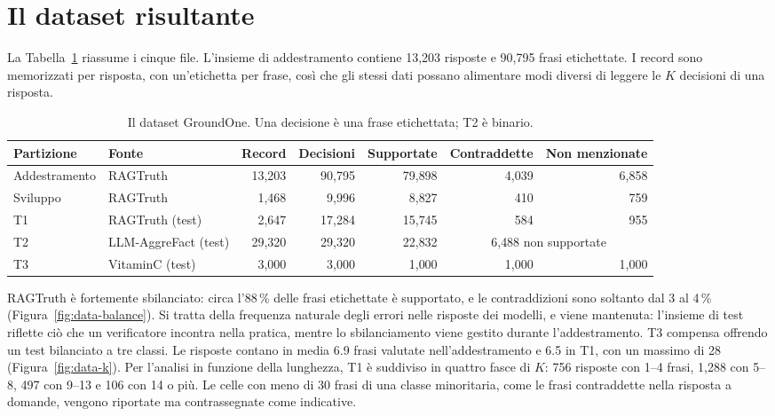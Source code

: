 \section{Il dataset risultante}
\label{sec:data-result}

La Tabella~\ref{tab:data-splits} riassume i cinque file. L'insieme di addestramento contiene 13{,}203 risposte e
90{,}795 frasi etichettate. I record sono memorizzati per risposta, con un'etichetta per frase, così che gli stessi dati
possano alimentare modi diversi di leggere le $K$ decisioni di una risposta.

\begin{table}[htbp]
\centering
\caption{Il dataset GroundOne. Una decisione è una frase etichettata; T2 è binario.}
\label{tab:data-splits}
\small
\begin{adjustbox}{max width=\textwidth}
\begin{tabular}{@{}llrrrrr@{}}
\toprule
Partizione & Fonte & Record & Decisioni & Supportate & Contraddette & Non menzionate \\
\midrule
Addestramento & RAGTruth & 13{,}203 & 90{,}795 & 79{,}898 & 4{,}039 & 6{,}858 \\
Sviluppo & RAGTruth & 1{,}468 & 9{,}996 & 8{,}827 & 410 & 759 \\
T1 & RAGTruth (test) & 2{,}647 & 17{,}284 & 15{,}745 & 584 & 955 \\
T2 & LLM-AggreFact (test) & 29{,}320 & 29{,}320 & 22{,}832 & \multicolumn{2}{c}{6{,}488 non supportate} \\
T3 & VitaminC (test) & 3{,}000 & 3{,}000 & 1{,}000 & 1{,}000 & 1{,}000 \\
\bottomrule
\end{tabular}
\end{adjustbox}
\end{table}

RAGTruth è fortemente sbilanciato: circa l'88\,\% delle frasi etichettate è supportato, e le contraddizioni sono
soltanto dal 3 al 4\,\% (Figura~\ref{fig:data-balance}). Si tratta della frequenza naturale degli errori nelle risposte
dei modelli, e viene mantenuta: l'insieme di test riflette ciò che un verificatore incontra nella pratica, mentre lo
sbilanciamento viene gestito durante l'addestramento. T3 compensa offrendo un test bilanciato a tre classi. Le risposte
contano in media 6.9 frasi valutate nell'addestramento e 6.5 in T1, con un massimo di 28 (Figura~\ref{fig:data-k}). Per
l'analisi in funzione della lunghezza, T1 è suddiviso in quattro fasce di $K$: 756 risposte con 1--4 frasi, 1{,}288 con
5--8, 497 con 9--13 e 106 con 14 o più. Le celle con meno di 30 frasi di una classe minoritaria, come le frasi
contraddette nella risposta a domande, vengono riportate ma contrassegnate come indicative.

